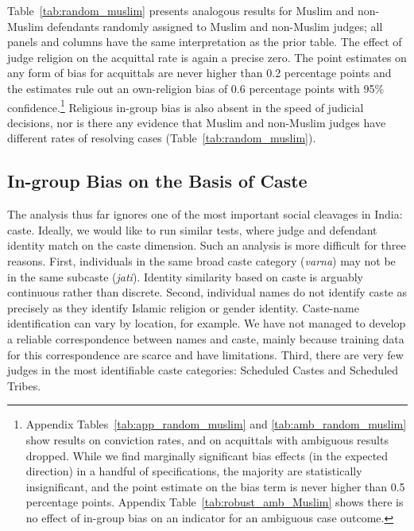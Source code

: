 \documentclass[12pt,english]{article}
\begin{document}

Table~\ref{tab:random_muslim} presents analogous results for Muslim and non-Muslim defendants randomly assigned to Muslim and non-Muslim judges; all panels and columns have the same interpretation as the prior table. The effect of judge religion on the acquittal rate is again a precise zero. The point estimates on any form of bias for acquittals are never higher than 0.2 percentage points and the estimates rule out an own-religion bias of 0.6 percentage points with 95\% confidence.\footnote{Appendix Tables~\ref{tab:app_random_muslim} and \ref{tab:amb_random_muslim} show results on conviction rates, and on acquittals with ambiguous results dropped. While we find marginally significant bias effects (in the expected direction) in a handful of specifications, the majority are statistically insignificant, and the point estimate on the bias term is never higher than 0.5 percentage points. Appendix Table~\ref{tab:robust_amb_Muslim} shows there is no effect of in-group bias on an indicator for an ambiguous case outcome.} Religious in-group bias is also absent in the speed of judicial decisions, nor is there any evidence that Muslim and non-Muslim judges have different rates of resolving cases (Table~\ref{tab:random_muslim}).

\subsection{In-group Bias on the Basis of Caste}

The analysis thus far ignores one of the most important social cleavages in India: caste. Ideally, we would like to run similar tests, where judge and defendant identity match on the caste dimension. Such an analysis is more difficult for three reasons. First, individuals in the same broad caste category (\textit{varna}) may not be in the same subcaste (\textit{jati}). Identity similarity based on caste is arguably continuous rather than discrete. Second, individual names do not identify caste as precisely as they identify Islamic religion or gender identity. Caste-name identification can vary by location, for example. We have not managed to develop a reliable correspondence between names and caste, mainly because training data for this correspondence are scarce and have limitations. Third, there are very few judges in the most identifiable caste categories: Scheduled Castes and Scheduled Tribes.
\end{document}

